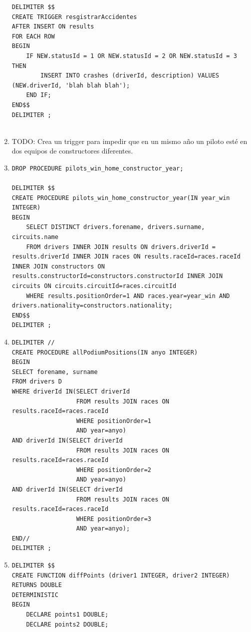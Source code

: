 \documentclass[a4paper]{article}
\begin{document}
\begin{enumerate}
\begin{verbatim}
DELIMITER $$
CREATE TRIGGER resgistrarAccidentes
AFTER INSERT ON results
FOR EACH ROW
BEGIN
    IF NEW.statusId = 1 OR NEW.statusId = 2 OR NEW.statusId = 3 THEN
    	INSERT INTO crashes (driverId, description) VALUES (NEW.driverId, 'blah blah blah');
    END IF;
END$$
DELIMITER ;            
            
    \end{verbatim}
    
    \item TODO: Crea un trigger para impedir que en un mismo año un piloto esté en dos equipos de constructores diferentes.
    
    \item 
    \begin{verbatim}
DROP PROCEDURE pilots_win_home_constructor_year;

DELIMITER $$
CREATE PROCEDURE pilots_win_home_constructor_year(IN year_win INTEGER)
BEGIN
    SELECT DISTINCT drivers.forename, drivers.surname, circuits.name
    FROM drivers INNER JOIN results ON drivers.driverId = results.driverId INNER JOIN races ON results.raceId=races.raceId INNER JOIN constructors ON results.constructorId=constructors.constructorId INNER JOIN circuits ON circuits.circuitId=races.circuitId 
    WHERE results.positionOrder=1 AND races.year=year_win AND drivers.nationality=constructors.nationality;
END$$
DELIMITER ;
    \end{verbatim}
    
    \item 
    \begin{verbatim}
DELIMITER //
CREATE PROCEDURE allPodiumPositions(IN anyo INTEGER)
BEGIN
SELECT forename, surname
FROM drivers D
WHERE driverId IN(SELECT driverId
                  FROM results JOIN races ON results.raceId=races.raceId
                  WHERE positionOrder=1
                  AND year=anyo)
AND driverId IN(SELECT driverId
                  FROM results JOIN races ON results.raceId=races.raceId
                  WHERE positionOrder=2
                  AND year=anyo)
AND driverId IN(SELECT driverId
                  FROM results JOIN races ON results.raceId=races.raceId
                  WHERE positionOrder=3
                  AND year=anyo);
END// 
DELIMITER ;    
    \end{verbatim}
    
    \item 
    \begin{verbatim}
DELIMITER $$
CREATE FUNCTION diffPoints (driver1 INTEGER, driver2 INTEGER)
RETURNS DOUBLE
DETERMINISTIC
BEGIN
    DECLARE points1 DOUBLE;
    DECLARE points2 DOUBLE;


\end{verbatim}
\end{enumerate}
\end{document}
